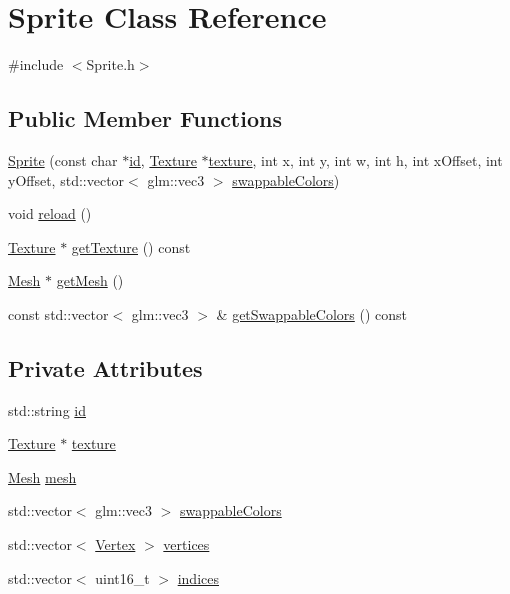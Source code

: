 \hypertarget{class_sprite}{}\section{Sprite Class Reference}
\label{class_sprite}


{\ttfamily \#include $<$Sprite.\+h$>$}

\subsection*{Public Member Functions}
\begin{DoxyCompactItemize}
\item 
\hyperlink{class_sprite_ac5f5ecc78c5f7ee7908c5d202d03260e}{Sprite} (const char $\ast$\hyperlink{class_sprite_a83f441d0dc80c048e94d464a74eae396}{id}, \hyperlink{class_texture}{Texture} $\ast$\hyperlink{class_sprite_a3d42412fa0ae1138f7f7bcf4e8d85110}{texture}, int x, int y, int w, int h, int x\+Offset, int y\+Offset, std\+::vector$<$ glm\+::vec3 $>$ \hyperlink{class_sprite_a0a11b213bedf3a2adc210d660a0b29e8}{swappable\+Colors})
\item 
void \hyperlink{class_sprite_a679597e8517454a28bcd3db3b281115d}{reload} ()
\item 
\hyperlink{class_texture}{Texture} $\ast$ \hyperlink{class_sprite_ad2c9622a0353ce1930e469d5fffce529}{get\+Texture} () const
\item 
\hyperlink{class_mesh}{Mesh} $\ast$ \hyperlink{class_sprite_a79dcf0629aa9ed6c93a55b21dd581770}{get\+Mesh} ()
\item 
const std\+::vector$<$ glm\+::vec3 $>$ \& \hyperlink{class_sprite_a4d4631f7a5657981ae92c44da94ecc0a}{get\+Swappable\+Colors} () const
\end{DoxyCompactItemize}
\subsection*{Private Attributes}
\begin{DoxyCompactItemize}
\item 
std\+::string \hyperlink{class_sprite_a83f441d0dc80c048e94d464a74eae396}{id}
\item 
\hyperlink{class_texture}{Texture} $\ast$ \hyperlink{class_sprite_a3d42412fa0ae1138f7f7bcf4e8d85110}{texture}
\item 
\hyperlink{class_mesh}{Mesh} \hyperlink{class_sprite_a1dc8b3ea170b512fae98fb572e5e1b24}{mesh}
\item 
std\+::vector$<$ glm\+::vec3 $>$ \hyperlink{class_sprite_a0a11b213bedf3a2adc210d660a0b29e8}{swappable\+Colors}
\item 
std\+::vector$<$ \hyperlink{struct_vertex}{Vertex} $>$ \hyperlink{class_sprite_af77b5223fb08a56ef686ee5755e3e52a}{vertices}
\item 
std\+::vector$<$ uint16\+\_\+t $>$ \hyperlink{class_sprite_a775d53abd90f5ebd94118535159e9849}{indices}
\end{DoxyCompactItemize}


